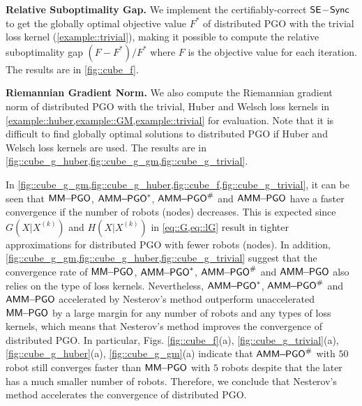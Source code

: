 \textbf{Relative Suboptimality Gap.} We implement the certifiably-correct $\mathsf{SE\!-\!Sync}$ \cite{rosen2016se} to get the globally optimal objective value $F^*$  of distributed PGO with the trivial loss kernel (\cref{example::trivial}), making it possible to compute the relative suboptimality gap $(F-F^*)/F^*$ where $F$ is the objective value for each iteration. The results are in \cref{fig::cube_f}.

\textbf{Riemannian Gradient Norm.}  We also compute the Riemannian gradient norm of distributed PGO with the trivial, Huber  and Welsch loss kernels in \cref{example::huber,example::GM,example::trivial} for evaluation. Note that it is difficult to find globally optimal solutions to distributed PGO if Huber and Welsch loss kernels are used. The results are in \cref{fig::cube_g_huber,fig::cube_g_gm,fig::cube_g_trivial}.



In \cref{fig::cube_g_gm,fig::cube_g_huber,fig::cube_f,fig::cube_g_trivial}, it can be seen that $\mathsf{MM\!\!-\!\!PGO}$, $\mathsf{AMM\!\!-\!\!PGO}^*$, $\mathsf{AMM\!\!-\!\!PGO}^{\#}$ and $\mathsf{AMM\!\!-\!\!PGO}$ have a faster convergence if the number of robots (nodes) decreases. This is expected since $G(X|X^{(k)})$ and $H(X|X^{(k)})$ in \cref{eq::G,eq::lG} result in tighter approximations for distributed PGO with fewer robots (nodes). In addition, \cref{fig::cube_g_gm,fig::cube_g_huber,fig::cube_g_trivial} suggest that the convergence rate of $\mathsf{MM\!\!-\!\!PGO}$, $\mathsf{AMM\!\!-\!\!PGO}^*$, $\mathsf{AMM\!\!-\!\!PGO}^{\#}$ and $\mathsf{AMM\!\!-\!\!PGO}$ also relies on the type of loss kernels. Nevertheless, $\mathsf{AMM\!\!-\!\!PGO}^*$, $\mathsf{AMM\!\!-\!\!PGO}^{\#}$ and $\mathsf{AMM\!\!-\!\!PGO}$ accelerated by Nesterov's method outperform  unaccelerated $\mathsf{MM\!\!-\!\!PGO}$  by a large margin for any number of robots and any types of loss kernels, which means that Nesterov's method improves the convergence of distributed PGO. In particular, Figs. \ref{fig::cube_f}(a), \ref{fig::cube_g_trivial}(a), \ref{fig::cube_g_huber}(a), \ref{fig::cube_g_gm}(a) indicate that $\mathsf{AMM\!\!-\!\!PGO}^{\#}$  with $50$ robot still converges faster than $\mathsf{MM\!\!-\!\!PGO}$ with $5$ robots despite that the later has a much smaller number of robots. Therefore, we conclude that Nesterov's method accelerates the convergence of distributed PGO.



